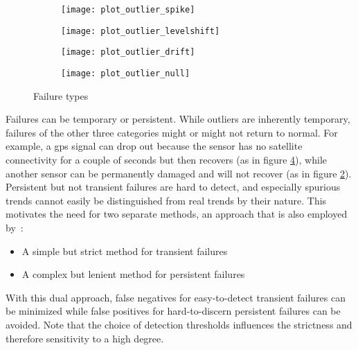 \begin{figure}[h]
	\begin{subfigure}[c]{0.5\textwidth}
		\centering
		\texttt{[image: plot\_outlier\_spike]}%
		\label{fig:failure-type-outlier}
	\end{subfigure}
	\begin{subfigure}[c]{0.5\textwidth}
		\centering
		\texttt{[image: plot\_outlier\_levelshift]}%
		\label{fig:failure-type-levelshift}
	\end{subfigure}
	\begin{subfigure}[c]{0.5\textwidth}
		\centering
		\texttt{[image: plot\_outlier\_drift]}%
		\label{fig:failure-type-drift}
	\end{subfigure}
	\begin{subfigure}[c]{0.5\textwidth}
		\centering
		\texttt{[image: plot\_outlier\_null]}%
		\label{fig:failure-type-null}
	\end{subfigure}
	\caption{Failure types}
	\label{fig:failure-types}
\end{figure}

Failures can be temporary or persistent. While outliers are inherently temporary, failures of the other three categories might or might not return to normal. For example, a \gls{gps} signal can drop out because the sensor has no satellite connectivity for a couple of seconds but then recovers (as in figure \ref{fig:failure-type-null}), while another sensor can be permanently damaged and will not recover (as in figure \ref{fig:failure-type-levelshift}). Persistent but not transient failures are hard to detect, and especially spurious trends cannot easily be distinguished from real trends by their nature. This motivates the need for two separate methods, an approach that is also employed by~\cite{Kabzan.2019}:
\begin{itemize}
\item A simple but strict method for transient failures
\item A complex but lenient method for persistent failures
\end{itemize}
With this dual approach, false negatives for easy-to-detect transient failures can be minimized while false positives for hard-to-discern persistent failures can be avoided. Note that the choice of detection thresholds influences the strictness and therefore sensitivity to a high degree.


